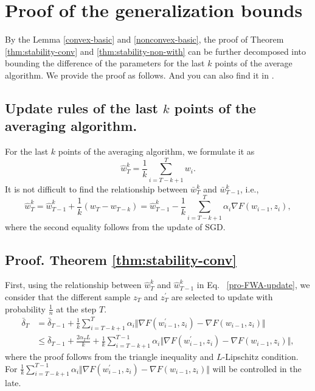 \section{Proof of the generalization bounds}\label{pro-con}
By the Lemma \ref{convex-basic} and \ref{nonconvex-basic}, the proof of Theorem \ref{thm:stability-conv} and \ref{thm:stability-non-with} can be further decomposed into bounding the difference of the parameters for the last $k$ points of the average algorithm. We provide the proof as follows. And you can also find it in \cite{peng2020dfwa}.

\subsection{Update rules of the last $k$ points of the averaging algorithm.}
For the last $k$ points of the averaging algorithm, we formulate it as
\begin{equation}\label{FWA-rules}
    \hat{w}^{k}_{T}=\frac{1}{k} \sum_{i=T-k+1}^{T} w_{i}.
\end{equation}
It is not difficult to find the relationship between $\bar{w}^{k}_{T}$ and $\bar{w}^{k}_{T-1}$, i.e.,
\begin{equation}\label{pro-FWA-update}
    \hat{w}^{k}_{T} = \hat{w}^{k}_{T-1} + \frac{1}{k}\left(w_{T} - w_{T-k}\right) = \hat{w}^{k}_{T-1} - \frac{1}{k}\sum_{i=T-k+1}^{T} \alpha_i\nabla F(w_{i-1},z_i),
\end{equation}
where the second equality follows from the update of SGD.



\subsection{\textbf{Proof. Theorem \ref{thm:stability-conv}}}\label{proof-thm-con-with}
  First, using the relationship between $\hat{w}^{k}_{T}$ and $\hat{w}^{k}_{T-1}$ in Eq. ~\eqref{pro-FWA-update}, we consider that the different sample $z_{T}$ and $z_{T}^{\prime}$ are selected to update with probability $\frac{1}{n}$ at the step $T$.  
\begin{equation}
  \begin{aligned}
   \bar{\delta}_{T} &= \bar{\delta}_{T-1} + \frac{1}{k}\sum_{i=T-k+1}^{T} \alpha_i \Vert\nabla F(w^{\prime}_{i-1},z_i) - \nabla F(w_{i-1},z_i) \Vert \\
   &\leq \bar{\delta}_{T-1} + \frac{2\alpha_T L}{k} + \frac{1}{k}\sum_{i=T-k+1}^{T-1} \alpha_i \Vert\nabla F(w^{\prime}_{i-1},z_i) - \nabla F(w_{i-1},z_i) \Vert ,
  \end{aligned}
 \end{equation}
where the proof follows from the triangle inequality and $L$-Lipschitz condition. For $\frac{1}{k}\sum_{i=T-k+1}^{T-1} \alpha_i \Vert\nabla F(w^{\prime}_{i-1},z_i) - \nabla F(w_{i-1},z_i) \Vert$ will be controlled in the late.

